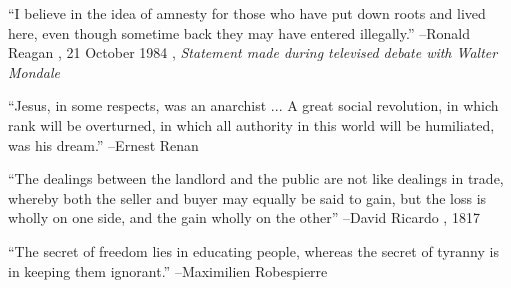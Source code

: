 \documentclass{article}%
\begin{document}
\begin{minipage}{\textwidth}%
\flushleft%
“I believe in the idea of amnesty for those who have put down roots and lived here, even though sometime back they may have entered illegally.”%
\linebreak%
\vspace{1mm}%
–Ronald Reagan%
, 21 October 1984%
, \textit{Statement made during televised debate with Walter Mondale}%
\linebreak%
\vspace{1mm}%
\end{minipage}%
\linebreak%
\vspace{1mm}%
\begin{minipage}{\textwidth}%
\flushleft%
“Jesus, in some respects, was an anarchist ... A great social revolution, in which rank will be overturned, in which all authority in this world will be humiliated, was his dream.”%
\linebreak%
\vspace{1mm}%
–Ernest Renan%
\linebreak%
\vspace{1mm}%
\end{minipage}%
\linebreak%
\vspace{1mm}%
\begin{minipage}{\textwidth}%
\flushleft%
“The dealings between the landlord and the public are not like dealings in trade, whereby both the seller and buyer may equally be said to gain, but the loss is wholly on one side, and the gain wholly on the other”%
\linebreak%
\vspace{1mm}%
–David Ricardo%
, 1817%
\linebreak%
\vspace{1mm}%
\end{minipage}%
\linebreak%
\vspace{1mm}%
\begin{minipage}{\textwidth}%
\flushleft%
“The secret of freedom lies in educating people, whereas the secret of tyranny is in keeping them ignorant.”%
\linebreak%
\vspace{1mm}%
–Maximilien Robespierre%
\linebreak%
\vspace{1mm}%
\end{minipage}%
\linebreak%
\vspace{1mm}%
\end{document}
